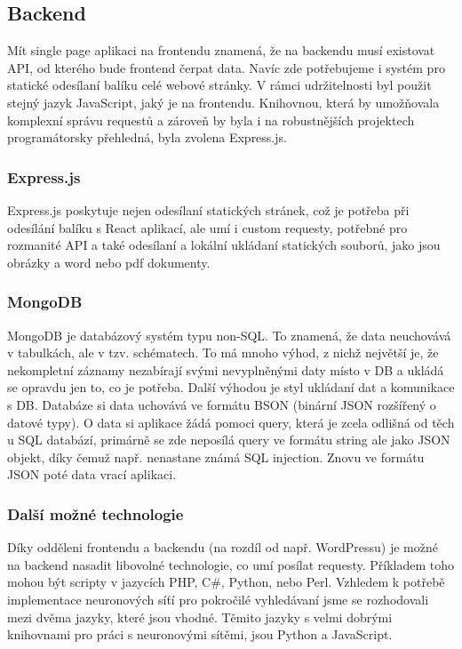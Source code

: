 \subsection{Backend}
Mít single page aplikaci na frontendu znamená, že na backendu musí existovat API,
od kterého bude frontend čerpat data.
Navíc zde potřebujeme i systém pro statické odesílaní balíku celé webové stránky.
V rámci udržitelnosti byl použit stejný jazyk JavaScript, jaký je na frontendu.
Knihovnou, která by umožňovala komplexní správu requestů a zároveň by byla
i na robustnějších projektech programátorsky přehledná, byla zvolena Express.js.

\subsubsection{Express.js}
Express.js poskytuje nejen odesílaní statických stránek,
což je potřeba při odesílání balíku s React aplikací, ale umí i
custom requesty, potřebné pro rozmanité API a také odesílaní a
lokální ukládaní statických souborů, jako jsou obrázky a word nebo pdf dokumenty.

\subsubsection{MongoDB}
MongoDB je databázový systém typu non-SQL.
To znamená, že data neuchovává v tabulkách, ale v tzv. schématech.
To má mnoho výhod, z nichž největší je, že nekompletní záznamy nezabírají
svými nevyplněnými daty místo v DB a ukládá se opravdu jen to, co je potřeba.
Další výhodou je styl ukládaní dat a komunikace s DB.
Databáze si data uchovává ve formátu BSON (binární JSON rozšířený o datové typy).
O data si aplikace žádá pomoci query,
která je zcela odlišná od těch u SQL databází,
primárně se zde neposílá query ve formátu string ale jako JSON objekt,
díky čemuž např. nenastane známá SQL injection.
Znovu ve formátu JSON poté data vrací aplikaci.

\subsubsection{Další možné technologie}
Díky odděleni frontendu a backendu (na rozdíl od např. WordPressu) je možné
na backend nasadit libovolné technologie, co umí posílat requesty.
Příkladem toho mohou být scripty v jazycích PHP, C\#, Python, nebo Perl.
Vzhledem k potřebě implementace neuronových síťí pro pokročilé vyhledávaní
jsme se rozhodovali mezi dvěma jazyky, které jsou vhodné. Těmito jazyky
s velmi dobrými knihovnami pro práci s neuronovými sítěmi, jsou
Python a JavaScript.

